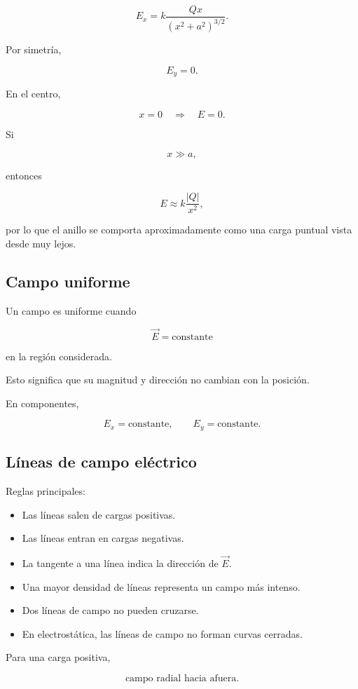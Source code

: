 \[
\boxed{
E_x=
k\frac{Qx}{(x^2+a^2)^{3/2}}
}.
\]

Por simetría,

\[
\boxed{E_y=0}.
\]

En el centro,

\[
x=0
\quad\Longrightarrow\quad
\boxed{E=0}.
\]

Si

\[
x\gg a,
\]

entonces

\[
\boxed{E\approx k\frac{|Q|}{x^2}},
\]

por lo que el anillo se comporta aproximadamente como una carga puntual vista desde muy lejos.


\subsection{Campo uniforme}

Un campo es uniforme cuando

\[
\boxed{\vec E=\text{constante}}
\]

en la región considerada.

Esto significa que su magnitud y dirección no cambian con la posición.

En componentes,

\[
\boxed{E_x=\text{constante}},
\qquad
\boxed{E_y=\text{constante}}.
\]


\subsection{Líneas de campo eléctrico}

Reglas principales:

\begin{itemize}
    \item Las líneas salen de cargas positivas.
    \item Las líneas entran en cargas negativas.
    \item La tangente a una línea indica la dirección de \(\vec E\).
    \item Una mayor densidad de líneas representa un campo más intenso.
    \item Dos líneas de campo no pueden cruzarse.
    \item En electrostática, las líneas de campo no forman curvas cerradas.
\end{itemize}

Para una carga positiva,

\[
\boxed{\text{campo radial hacia afuera}}.
\]

